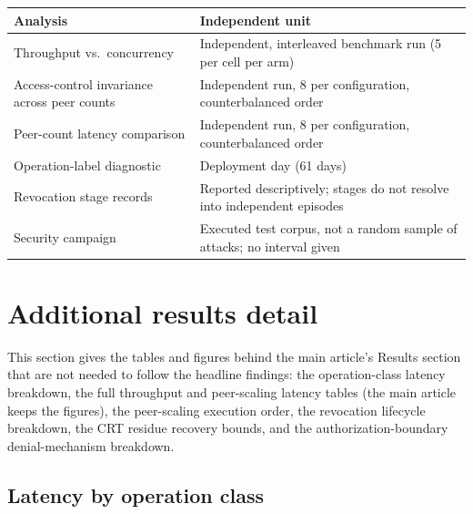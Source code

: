 \begin{widetab}
\caption{Experimental unit used for each analysis in the main article.}
\label{tab:units}
\small
\begin{tabularx}{\tblwidth}{@{}lX@{}}
\toprule
Analysis & Independent unit \\
\midrule
Throughput vs.\ concurrency &
  Independent, interleaved benchmark run (5 per cell per arm) \\
Access-control invariance across peer counts &
  Independent run, 8 per configuration, counterbalanced order \\
Peer-count latency comparison &
  Independent run, 8 per configuration, counterbalanced order \\
Operation-label diagnostic &
  Deployment day (61 days) \\
Revocation stage records &
  Reported descriptively; stages do not resolve into independent episodes \\
Security campaign &
  Executed test corpus, not a random sample of attacks; no interval given \\
\bottomrule
\end{tabularx}
\end{widetab}

\clearpage
\section{Additional results detail}
\label{sec:supp_results}

This section gives the tables and figures behind the main article's Results
section that are not needed to follow the headline findings: the
operation-class latency breakdown, the full throughput and peer-scaling
latency tables (the main article keeps the figures), the peer-scaling
execution order, the revocation lifecycle breakdown, the CRT residue
recovery bounds, and the authorization-boundary denial-mechanism breakdown.

\subsection{Latency by operation class}



\begin{widefig}
\centering
{}
\caption{Empirical latency distributions for the two committed transaction classes.}
\label{fig:cdf}
\end{widefig}

